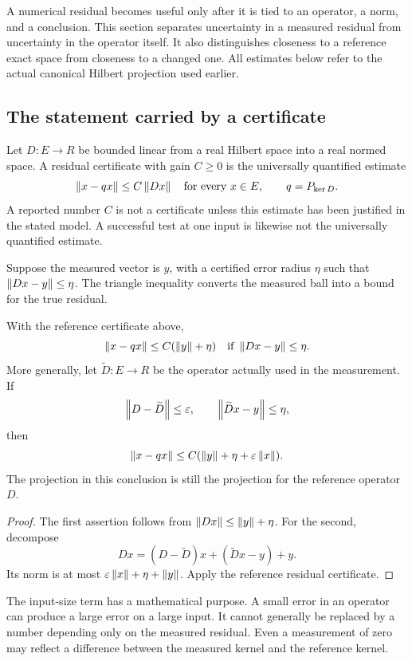 \label{sec:certificate-reading}
A numerical residual becomes useful only after it is tied to an operator, a norm, and a conclusion. This section separates uncertainty in a measured residual from uncertainty in the operator itself. It also distinguishes closeness to a reference exact space from closeness to a changed one. All estimates below refer to the actual canonical Hilbert projection used earlier.

\subsection{The statement carried by a certificate}
Let \(D:E\to R\) be bounded linear from a real Hilbert space into a real normed space. A residual certificate with gain \(C\ge0\) is the universally quantified estimate
\[
 \left\lVert x-qx\right\rVert\le C\left\lVert Dx\right\rVert\quad\text{for every }x\in E,
 \qquad q=P_{\ker D}.
\]
A reported number \(C\) is not a certificate unless this estimate has been justified in the stated model. A successful test at one input is likewise not the universally quantified estimate.

Suppose the measured vector is \(y\), with a certified error radius \(\eta\) such that \(\left\lVert Dx-y\right\rVert\le\eta\). The triangle inequality converts the measured ball into a bound for the true residual.

\begin{proposition}\label{KS69}
With the reference certificate above,
\[
 \left\lVert x-qx\right\rVert\le C(\left\lVert y\right\rVert+\eta)
 \quad\text{if }\left\lVert Dx-y\right\rVert\le\eta.
\]
More generally, let \(\widetilde D:E\to R\) be the operator actually used in the measurement. If
\[
 \left\lVert D-\widetilde D\right\rVert\le\varepsilon,
 \qquad\left\lVert\widetilde D x-y\right\rVert\le\eta,
\]
then
\begin{equation}\label{eq:measured-reference}
 \left\lVert x-qx\right\rVert\le C(\left\lVert y\right\rVert+\eta+\varepsilon\left\lVert x\right\rVert).
\end{equation}
The projection in this conclusion is still the projection for the reference operator \(D\).
\end{proposition}
\begin{proof}
The first assertion follows from \(\left\lVert Dx\right\rVert\le\left\lVert y\right\rVert+\eta\). For the second, decompose
\[
 Dx=(D-\widetilde D)x+(\widetilde D x-y)+y.
\]
Its norm is at most \(\varepsilon\left\lVert x\right\rVert+\eta+\left\lVert y\right\rVert\). Apply the reference residual certificate.
\end{proof}
The input-size term has a mathematical purpose. A small error in an operator can produce a large error on a large input. It cannot generally be replaced by a number depending only on the measured residual. Even a measurement of zero may reflect a difference between the measured kernel and the reference kernel.

